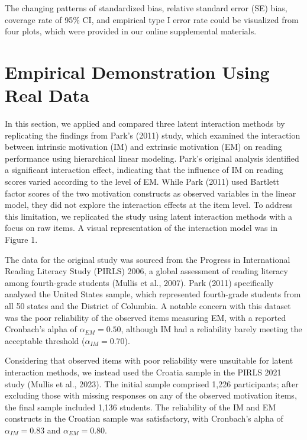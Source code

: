 \documentclass[
  man]{apa6}
\begin{document}
The changing patterns of standardized bias, relative standard error (SE) bias, coverage rate of 95\% CI, and empirical type I error rate could be visualized from four plots, which were provided in our online supplemental materials.

\section{Empirical Demonstration Using Real Data}\label{empirical-demonstration-using-real-data}

In this section, we applied and compared three latent interaction methods by replicating the findings from Park's (2011) study, which examined the interaction between intrinsic motivation (IM) and extrinsic motivation (EM) on reading performance using hierarchical linear modeling. Park's original analysis identified a significant interaction effect, indicating that the influence of IM on reading scores varied according to the level of EM. While Park (2011) used Bartlett factor scores of the two motivation constructs as observed variables in the linear model, they did not explore the interaction effects at the item level. To address this limitation, we replicated the study using latent interaction methods with a focus on raw items. A visual representation of the interaction model was in Figure 1.

The data for the original study was sourced from the Progress in International Reading Literacy Study (PIRLS) 2006, a global assessment of reading literacy among fourth-grade students (Mullis et al., 2007). Park (2011) specifically analyzed the United States sample, which represented fourth-grade students from all 50 states and the District of Columbia. A notable concern with this dataset was the poor reliability of the observed items measuring EM, with a reported Cronbach's alpha of \(\alpha_{EM} = 0.50\), although IM had a reliability barely meeting the acceptable threshold (\(\alpha_{IM} = 0.70\)).

Considering that observed items with poor reliability were unsuitable for latent interaction methods, we instead used the Croatia sample in the PIRLS 2021 study (Mullis et al., 2023). The initial sample comprised 1,226 participants; after excluding those with missing responses on any of the observed motivation items, the final sample included 1,136 students. The reliability of the IM and EM constructs in the Croatian sample was satisfactory, with Cronbach's alpha of \(\alpha_{IM} = 0.83\) and \(\alpha_{EM} = 0.80\).
\end{document}
